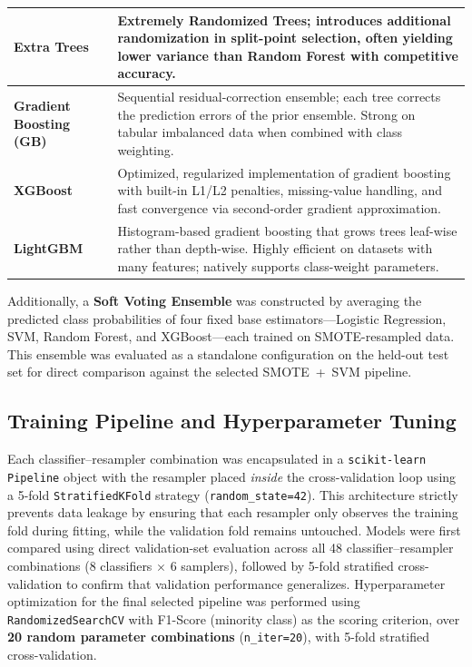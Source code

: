 \begin{longtable}{|p{4.2cm}|p{11.4cm}|}
    \textbf{Extra Trees} &
    Extremely Randomized Trees; introduces additional randomization in split-point selection, often yielding lower variance than Random Forest with competitive accuracy. \\
    \hline

    \textbf{Gradient Boosting (GB)} &
    Sequential residual-correction ensemble; each tree corrects the prediction errors of the prior ensemble. Strong on tabular imbalanced data when combined with class weighting. \\
    \hline

    \textbf{XGBoost} &
    Optimized, regularized implementation of gradient boosting with built-in L1/L2 penalties, missing-value handling, and fast convergence via second-order gradient approximation. \\
    \hline

    \textbf{LightGBM} &
    Histogram-based gradient boosting that grows trees leaf-wise rather than depth-wise. Highly efficient on datasets with many features; natively supports class-weight parameters. \\
    \hline

\end{longtable}

Additionally, a \textbf{Soft Voting Ensemble} was constructed by averaging the predicted class probabilities of four fixed base estimators---Logistic Regression, SVM, Random Forest, and XGBoost---each trained on SMOTE-resampled data. This ensemble was evaluated as a standalone configuration on the held-out test set for direct comparison against the selected SMOTE~+~SVM pipeline.

\subsection{Training Pipeline and Hyperparameter Tuning}
\label{subsec:pipeline}

Each classifier--resampler combination was encapsulated in a \texttt{scikit-learn} \texttt{Pipeline} object with the resampler placed \textit{inside} the cross-validation loop using a 5-fold \texttt{StratifiedKFold} strategy (\texttt{random\_state=42}). This architecture strictly prevents data leakage by ensuring that each resampler only observes the training fold during fitting, while the validation fold remains untouched. Models were first compared using direct validation-set evaluation across all 48 classifier--resampler combinations (8 classifiers $\times$ 6 samplers), followed by 5-fold stratified cross-validation to confirm that validation performance generalizes. Hyperparameter optimization for the final selected pipeline was performed using \texttt{RandomizedSearchCV} with F1-Score (minority class) as the scoring criterion, over \textbf{20 random parameter combinations} (\texttt{n\_iter=20}), with 5-fold stratified cross-validation.

